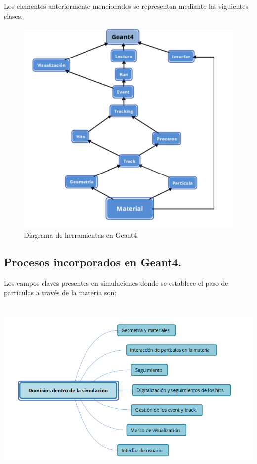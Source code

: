 \documentclass[12pt,fleqn]{book} %
\numberwithin{equation}{section} %
\numberwithin{figure}{section} %
\numberwithin{table}{section} %
\begin{document}
{Los elementos anteriormente mencionados se representan mediante las siguientes clases:
\begin{figure}[h]
\centering
  \includegraphics[scale=0.7]{cat}
  \caption{ Diagrama de herramientas en Geant4.}
  \label{fig:gatos}
\end{figure}

\subsection{Procesos incorporados en Geant4.}

Los campos claves presentes en simulaciones donde se establece el paso de partículas a través de la materia son:
 \begin{center}
 \centering
\includegraphics[height=9.0cm]{dom}
\end{center}

}
\end{document}
